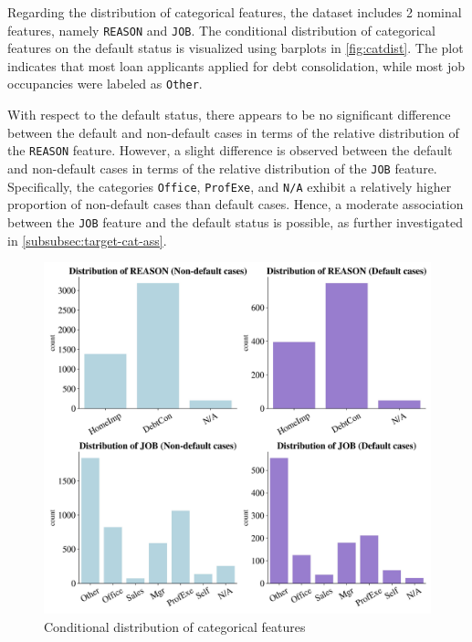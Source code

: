    Regarding the distribution of categorical features, the dataset includes 2 nominal features, namely \texttt{REASON} and \texttt{JOB}.
    The conditional distribution of categorical features on the default status is visualized using barplots in \autoref{fig:catdist}.
    The plot indicates that most loan applicants applied for debt consolidation, while most job occupancies were labeled as \texttt{Other}.

    With respect to the default status, there appears to be no significant difference between the default and non-default cases in terms of the relative distribution of the \texttt{REASON} feature.
    However, a slight difference is observed between the default and non-default cases in terms of the relative distribution of the \texttt{JOB} feature.
    Specifically, the categories \texttt{Office}, \texttt{ProfExe}, and \texttt{N/A} exhibit a relatively higher proportion of non-default cases than default cases.
    Hence, a moderate association between the \texttt{JOB} feature and the default status is possible, as further investigated in \autoref{subsubsec:target-cat-ass}.


    \begin{figure}[H]
        \centering
        \caption{Conditional distribution of categorical features}\vspace{0.5em}
        \label{fig:catdist}
        \includegraphics[width=140mm]{Figures/Categorical_Features_Distribution.jpg}
        \vspace{-1em}
        \end{figure}
